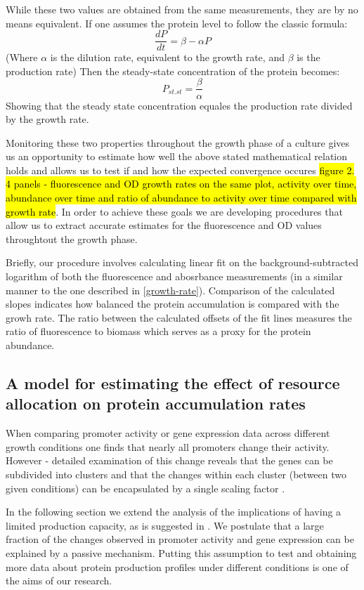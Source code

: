 \documentclass{report}
\begin{document}
While these two values are obtained from the same measurements, they are by no means equivalent.
If one assumes the protein level to follow the classic formula:
\[ \frac{dP}{dt}=\beta-\alpha P\]
(Where $\alpha$ is the dilution rate, equivalent to the growth rate, and $\beta$ is the production rate)
Then the steady-state concentration of the protein becomes:
\[ P_{st.st}=\frac{\beta}{\alpha}\]
Showing that the steady state concentration equales the production rate divided by the growth rate.

Monitoring these two properties throughout the growth phase of a culture gives us an opportunity to estimate how well the above stated mathematical relation holds and allows us to test if and how the expected convergence occures \hl{figure 2. 4 panels - fluorescence and OD growth rates on the same plot, activity over time, abundance over time and ratio of abundance to activity over time compared with growth rate}.
In order to achieve these goals we are developing procedures that allow us to extract accurate estimates for the fluorescence and OD values throughtout the growth phase.

Briefly, our procedure involves calculating linear fit on the background-subtracted logarithm of both the fluorescence and abosrbance measurements (in a similar manner to the one described in \ref{growth-rate}).
Comparison of the calculated slopes indicates how balanced the protein accumulation is compared with the growh rate.
The ratio between the calculated offsets of the fit lines measures the ratio of fluorescence to biomass which serves as a proxy for the protein abundance.
\subsection{A model for estimating the effect of resource allocation on protein accumulation rates}
When comparing promoter activity or gene expression data across different growth conditions one finds that nearly all promoters change their activity.
However - detailed examination of this change reveals that the genes can be subdivided into clusters and that the changes within each cluster (between two given conditions) can be encapsulated by a single scaling factor \cite{Leeat2013}.

In the following section we extend the analysis of the implications of having a limited production capacity, as is suggested in \cite{Leeat2013}.
We postulate that a large fraction of the changes observed in promoter activity and gene expression can be explained by a passive mechanism.
Putting this assumption to test and obtaining more data about protein production profiles under different conditions is one of the aims of our research.
\end{document}
